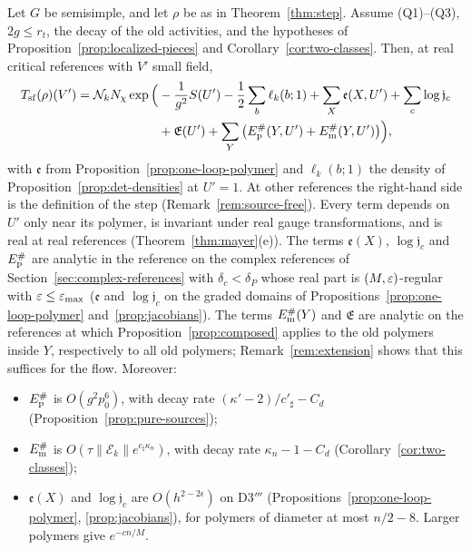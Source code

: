 \begin{theorem}\label{thm:sf-step}
Let $G$ be semisimple, and let $\rho$ be as in Theorem~\ref{thm:step}. Assume (Q1)--(Q3), $2g\le r_t$, the decay of the old activities, and the hypotheses of Proposition~\ref{prop:localized-pieces} and Corollary~\ref{cor:two-classes}. Then, at real critical references with $V'$ small field,
\[
\begin{aligned}
T_{\rm sf}(\rho)(V')=\mathcal N_kN_\chi\exp\Big(&-\frac1{g^2}S(U')-\frac12\sum_b\ell_k(b;1)+\sum_X\mathfrak e(X,U')+\sum_c\log\mathfrak j_c\\
&+\mathfrak E(U')+\sum_Y\big(E^\#_{\rm p}(Y,U')+E^\#_{\rm m}(Y,U')\big)\Big),
\end{aligned}
\]
with $\mathfrak e$ from Proposition~\ref{prop:one-loop-polymer} and $\ell_k(b;1)$ the density of Proposition~\ref{prop:det-densities} at $U'=1$. At other references the right-hand side is the definition of the step (Remark~\ref{rem:source-free}). Every term depends on $U'$ only near its polymer, is invariant under real gauge transformations, and is real at real references (Theorem~\ref{thm:mayer}(e)). The terms $\mathfrak e(X)$, $\log\mathfrak j_c$ and $E^\#_{\rm p}$ are analytic in the reference on the complex references of Section~\ref{sec:complex-references} with $\delta_c<\delta_P$ whose real part is $(M,\varepsilon)$-regular with $\varepsilon\le\varepsilon_{\max}$ ($\mathfrak e$ and $\log\mathfrak j_c$ on the graded domains of Propositions~\ref{prop:one-loop-polymer} and~\ref{prop:jacobians}). The terms $E^\#_{\rm m}(Y)$ and $\mathfrak E$ are analytic on the references at which Proposition~\ref{prop:composed} applies to the old polymers inside $Y$, respectively to all old polymers; Remark~\ref{rem:extension} shows that this suffices for the flow. Moreover:
\begin{itemize}
\item $E^\#_{\rm p}$ is $O(g^2p_0^6)$, with decay rate $(\kappa'-2)/c'_\sharp-C_d$ (Proposition~\ref{prop:pure-sources});
\item $E^\#_{\rm m}$ is $O(\tau\|\mathcal E_k\|e^{c_\natural\kappa_n})$, with decay rate $\kappa_n-1-C_d$ (Corollary~\ref{cor:two-classes});
\item $\mathfrak e(X)$ and $\log\mathfrak j_c$ are $O(h^{2-2\epsilon})$ on D3$'''$ (Propositions~\ref{prop:one-loop-polymer}, \ref{prop:jacobians}), for polymers of diameter at most $n/2-8$. Larger polymers give $e^{-cn/M}$.
\end{itemize}
\end{theorem}

